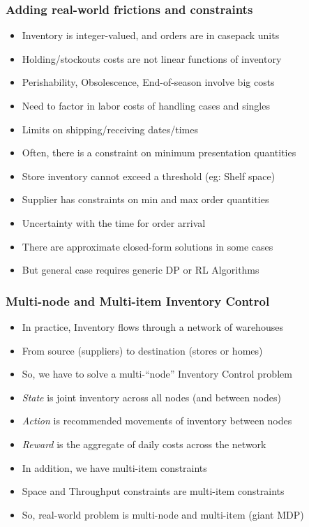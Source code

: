 \documentclass[handout]{beamer}
\begin{document}
\begin{frame}
\frametitle{Adding real-world frictions and constraints}
\pause
\begin{itemize}[<+->]
\item Inventory is integer-valued, and orders are in casepack units
\item Holding/stockouts costs are not linear functions of inventory
\item Perishability, Obsolescence, End-of-season involve big costs 
\item Need to factor in labor costs of handling cases and singles
\item Limits on shipping/receiving dates/times
\item Often, there is a constraint on minimum presentation quantities
\item Store inventory cannot exceed a threshold (eg: Shelf space)
\item Supplier has constraints on min and max order quantities
\item Uncertainty with the time for order arrival
\item There are approximate closed-form solutions in some cases
\item But general case requires generic DP or RL Algorithms
\end{itemize}
\end{frame}

\begin{frame}
\frametitle{Multi-node and Multi-item Inventory Control}
\pause
\begin{itemize}[<+->]
\item In practice, Inventory flows through a network of warehouses
\item From source (suppliers) to destination (stores or homes)
\item So, we have to solve a multi-``node'' Inventory Control problem
\item {\em State} is joint inventory across all nodes (and between nodes)
\item {\em Action} is recommended movements of inventory between nodes
\item {\em Reward} is the aggregate of daily costs across the network
\item In addition, we have multi-item constraints
\item Space and Throughput constraints are multi-item constraints
\item So, real-world problem is multi-node and multi-item (giant MDP)
\end{itemize}
\end{frame}
\end{document}
